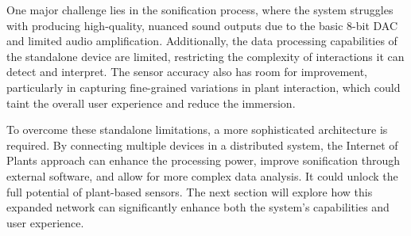 One major challenge lies in the sonification process, where the system struggles with producing high-quality, nuanced sound outputs due to the basic 8-bit DAC and limited audio amplification. Additionally, the data processing capabilities of the standalone device are limited, restricting the complexity of interactions it can detect and interpret. The sensor accuracy also has room for improvement, particularly in capturing fine-grained variations in plant interaction, which could taint the overall user experience and reduce the immersion.

To overcome these standalone limitations, a more sophisticated architecture is required. By connecting multiple devices in a distributed system, the Internet of Plants approach can enhance the processing power, improve sonification through external software, and allow for more complex data analysis. It could unlock the  full potential of plant-based sensors. The next section will explore how this expanded network can significantly enhance both the system's capabilities and user experience.
